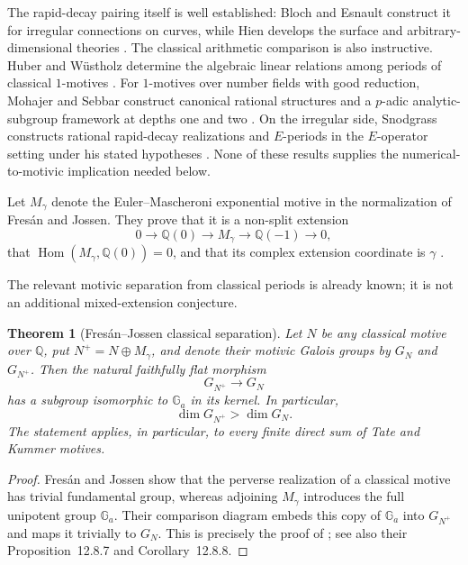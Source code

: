 \documentclass[11pt]{article}
\newtheorem{theorem}{Theorem}[section]
\theoremstyle{definition}
\theoremstyle{remark}
\begin{document}
The rapid-decay pairing itself is well established: Bloch and Esnault
construct it for irregular connections on curves, while Hien develops the
surface and arbitrary-dimensional theories
\cite{BlochEsnault2004,Hien2007,Hien2009}.  The classical arithmetic
comparison is also instructive.  Huber and W\"ustholz determine the
algebraic linear relations among periods of classical $1$-motives
\cite{HuberWustholz}.  For $1$-motives over number fields with good
reduction, Mohajer and Sebbar construct canonical rational structures and a
$p$-adic analytic-subgroup framework at depths one and two
\cite{MohajerSebbar2025}.  On the irregular side, Snodgrass constructs
rational rapid-decay realizations and $E$-periods in the $E$-operator
setting under his stated hypotheses \cite{Snodgrass2026}.  None of these
results supplies the numerical-to-motivic implication needed below.

Let $M_\gamma$ denote the Euler--Mascheroni exponential motive in the
normalization of Fres\'an and Jossen.  They prove that it is a non-split
extension
\begin{equation}\label{eq:euler-motive-extension}
 0\longrightarrow\mathbb Q(0)
 \longrightarrow M_\gamma
 \longrightarrow\mathbb Q(-1)
 \longrightarrow0,
\end{equation}
that $\operatorname{Hom}(M_\gamma,\mathbb Q(0))=0$, and that its complex
extension coordinate is $\gamma$ \cite[Sec.~12.8]{FresanJossen}.

The relevant motivic separation from classical periods is already known;
it is not an additional mixed-extension conjecture.

\begin{theorem}[Fres\'an--Jossen classical separation]
\label{thm:fresan-jossen-classical-separation}
Let $N$ be any classical motive over $\mathbb Q$, put
$N^+=N\oplus M_\gamma$, and denote their motivic Galois groups by
$G_N$ and $G_{N^+}$.  Then the natural faithfully flat morphism
\[
 G_{N^+}\longrightarrow G_N
\]
has a subgroup isomorphic to $\mathbb G_a$ in its kernel.  In particular,
\begin{equation}\label{eq:fresan-jossen-dimension-jump}
 \dim G_{N^+}>\dim G_N.
\end{equation}
The statement applies, in particular, to every finite direct sum of Tate
and Kummer motives.
\end{theorem}

\begin{proof}
Fres\'an and Jossen show that the perverse realization of a classical
motive has trivial fundamental group, whereas adjoining $M_\gamma$
introduces the full unipotent group $\mathbb G_a$.  Their comparison diagram
embeds this copy of $\mathbb G_a$ into $G_{N^+}$ and maps it trivially to
$G_N$.  This is precisely the proof of
\cite[Cor.~12.8.12]{FresanJossen}; see also their
Proposition~12.8.7 and Corollary~12.8.8.
\end{proof}
\end{document}
